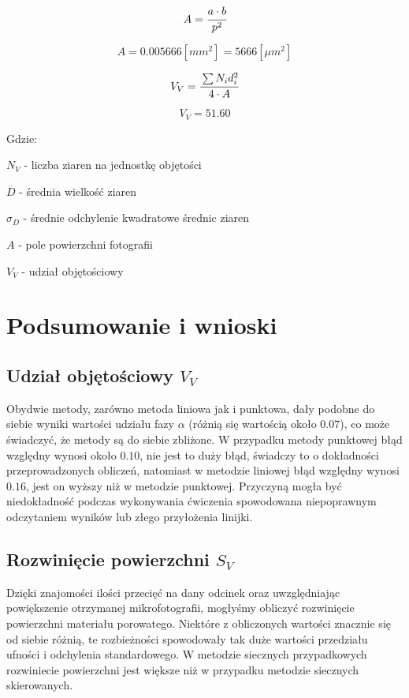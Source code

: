 \documentclass[a4paper,12pt]{article}
\begin{document}
$$A=\cfrac{a\cdot b}{p^2}$$

$$A=0.005666[mm^2]=5666[\mu m^2]$$

$$V_V=\cfrac{\sum N_id_i^2}{4\cdot A}$$

$$V_V=51.60$$

Gdzie:

$N_V$ - liczba ziaren na jednostkę objętości

$\overline{D}$ - średnia wielkość ziaren

$\sigma_D$ - średnie odchylenie kwadratowe średnic ziaren

$A$ - pole powierzchni fotografii

$V_V$ - udział objętościowy

\section{Podsumowanie i wnioski}

\subsection{Udział objętościowy $V_V$}



Obydwie metody, zarówno metoda liniowa jak i punktowa, dały podobne  do siebie wyniki wartości udziału fazy $\alpha$ (różnią się wartością około $0.07$), co może świadczyć, że metody są do siebie zbliżone. W przypadku metody punktowej błąd względny wynosi  około $0.10$, nie jest to duży błąd, świadczy to  o dokładności przeprowadzonych obliczeń, natomiast w metodzie liniowej błąd względny wynosi  $0.16$, jest on wyższy niż w metodzie punktowej. Przyczyną mogła być niedokładność  podczas wykonywania  ćwiczenia spowodowana niepoprawnym odczytaniem wyników lub złego przyłożenia linijki.

\subsection{Rozwinięcie powierzchni $S_V$}



Dzięki znajomości ilości przecięć na dany odcinek oraz uwzględniając powiększenie otrzymanej mikrofotografii, mogłyśmy obliczyć rozwinięcie powierzchni materiału porowatego. Niektóre z obliczonych wartości znacznie się od siebie różnią, te rozbieżności spowodowały tak duże wartości przedziału ufności i odchylenia standardowego. W metodzie siecznych przypadkowych rozwiniecie powierzchni jest większe niż w przypadku metodzie siecznych skierowanych.
\end{document}
